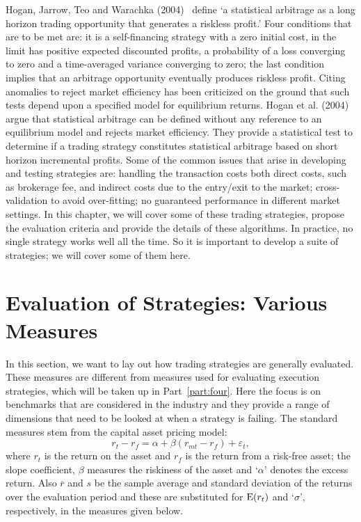 Hogan, Jarrow, Teo and Warachka (2004)~\cite{Hogan} define `a statistical arbitrage as a long horizon trading opportunity that generates a riskless profit.' Four conditions that are to be met are: it is a self-financing strategy with a zero initial cost, in the limit has positive expected discounted profits, a probability of a loss converging to zero and a time-averaged variance converging to zero; the last condition implies that an arbitrage opportunity eventually produces riskless profit. Citing anomalies to reject  market efficiency has been criticized on the ground that such tests depend upon a specified model for equilibrium returns. Hogan et al. (2004)~\cite{Hogan} argue that statistical arbitrage can be defined without any reference to an equilibrium model and rejects market efficiency. They provide a statistical test to determine if a trading strategy constitutes statistical arbitrage based on short horizon incremental profits. Some of the common issues that arise in developing and testing strategies are: handling the transaction costs both direct costs, such as brokerage fee, and indirect costs due to the entry/exit to the market; cross-validation to avoid over-fitting; no guaranteed performance in different market settings. In this chapter, we will cover some of these trading strategies, propose the evaluation criteria and provide the details of these algorithms. In practice, no single strategy works well all the time. So it is important to develop a suite of strategies; we will cover some of them here.



\section{Evaluation of Strategies: Various Measures\label{sec:various_measures}}\label{in:apt}

In this section, we want to lay out how trading strategies are generally evaluated. These measures are different from measures used for evaluating execution strategies, which will be taken up in Part~\ref{part:four}. Here the focus is on benchmarks that are considered in the industry and they provide a range of dimensions that need to be looked at when a strategy is failing. The standard measures stem from the capital asset pricing model:
	\begin{equation} \label{eqn:rt_minus_rf_is}
	r_{t} - r_f = \alpha + \beta (r_{mt} - r_f) + \varepsilon_{t},
	\end{equation}
where $r_t$ is the return on the asset and $r_f$ is the return from a risk-free asset; the slope coefficient, $\beta$ measures the riskiness of the asset and `$\alpha$' denotes the excess return. Also $\overline{r}$ and $s$ be the sample average and standard deviation of the returns over the evaluation period and these are substituted for $\operatorname{E}(r_t)$ and `$\sigma$', respectively, in the measures given below.\label{in:benchmark}

